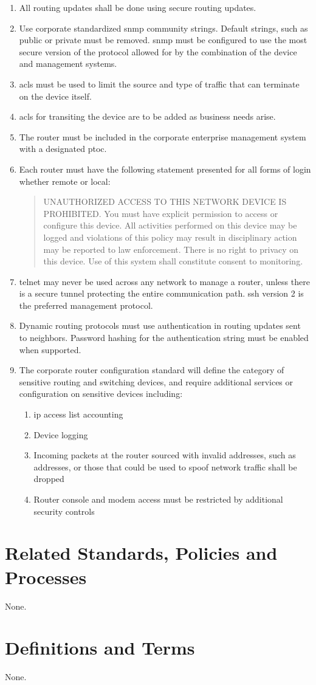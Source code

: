 \begin{enumerate}
\item
All routing updates shall be done using secure routing updates.
\item
Use corporate standardized \gls{snmp} community strings.  
Default strings, such as public or private must be removed.  
\gls{snmp} must be configured to use the most secure version of the protocol allowed for by the combination of the device and management systems.
\item
\gls{acl}s must be used to limit the source and type of traffic that can terminate on the device itself.
\item
\gls{acl}s for transiting the device are to be added as business needs arise. 
\item
The router must be included in the corporate enterprise management system with a designated \gls{ptoc}. 
\item
Each router must have the following statement presented for all forms of login whether remote or local:
\begin{quote}\ttfamily{}UNAUTHORIZED ACCESS TO THIS NETWORK DEVICE IS PROHIBITED.  You must have explicit permission to access or configure this device.  All activities performed on this device may be logged\del{,} and violations of this policy may result in disciplinary action may be reported to law enforcement.  There is no right to privacy on this device.  Use of this system shall constitute consent to monitoring.
\end{quote}
\item
\gls{telnet} may never be used across any network to manage a router, unless there is a secure tunnel protecting the entire communication path.  
\gls{ssh} version 2 is the preferred management protocol.
\item
Dynamic routing protocols must use authentication in routing updates sent to neighbors.  
Password hashing for the authentication string must be enabled when supported.
\item
The corporate router configuration standard will define the category of sensitive routing and switching devices, and require additional services or configuration on sensitive devices including:
\begin{enumerate}
\item
\gls{ip} access list accounting
\item
Device logging
\item
Incoming packets at the router sourced with invalid addresses, such as  addresses, or those that could be used to spoof network traffic shall be dropped
\item
Router console and modem access must be restricted by additional security controls
\end{enumerate}
\end{enumerate}
\CommonPolicyCompliance
\section{Related Standards, Policies\oxford{} and Processes}
None.
\section{Definitions and Terms}
None.
\CommonRevisionHistory